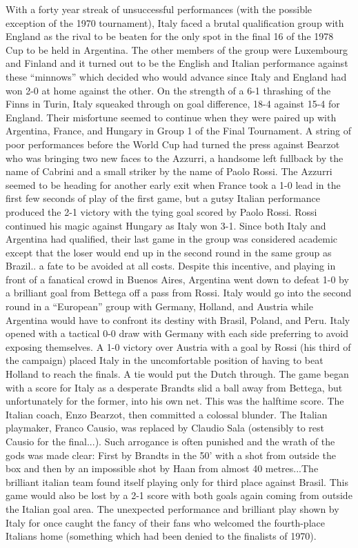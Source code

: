 With a forty year streak of unsuccessful performances (with the possible 
exception of the 1970 tournament), Italy faced a brutal qualification group with
England as the rival to be beaten for the only spot in the final 16 of the 1978
Cup to be held in Argentina. The other members of the group were Luxembourg and
Finland and it turned out to be the English and Italian performance against 
these ``minnows'' which decided who would advance since Italy and England had 
won 2-0 at home against the other. On the strength of a 6-1 thrashing of the 
Finns in Turin, Italy squeaked through on goal difference, 18-4 against 15-4 
for England. Their misfortune seemed to continue when they were paired up with 
Argentina, France, and Hungary in Group 1 of the Final Tournament. A string of 
poor performances before the World Cup had turned the press against Bearzot who
was bringing two new faces to the Azzurri, a handsome left fullback by the name
of Cabrini and a small striker by the name of Paolo Rossi. The Azzurri seemed 
to be heading for another early exit when France took a 1-0 lead in the first 
few seconds of play of the first game, but a gutsy Italian performance produced
the 2-1 victory with the tying goal scored by Paolo Rossi. Rossi continued his
magic against Hungary as Italy won 3-1. Since both Italy and Argentina had
qualified, their last game in the group was considered academic except that the
loser would end up in the second round in the same group as Brazil.. a fate to 
be avoided at all costs. Despite this incentive, and playing in front of a 
fanatical crowd in Buenos Aires, Argentina went down to defeat 1-0 by a 
brilliant goal from Bettega off a pass from Rossi. Italy would go into the 
second round in a ``European'' group with Germany, Holland, and Austria while 
Argentina would have to confront its destiny with Brasil, Poland, and Peru. 
Italy opened with a tactical 0-0 draw with Germany with each side preferring
to avoid exposing themselves. A 1-0 victory over Austria with a goal by Rossi
(his third of the campaign) placed Italy in the uncomfortable position of
having to beat Holland to reach the finals. A tie would put the Dutch through.
The game began with a score for Italy as a desperate Brandts slid a ball away 
from Bettega, but unfortunately for the former, into his own net. This was the 
halftime score. The Italian coach, Enzo Bearzot, then committed a colossal 
blunder. The Italian playmaker, Franco Causio, was replaced by Claudio Sala 
(ostensibly to rest Causio for the final...). Such arrogance is often punished 
and the wrath of the gods was made clear: First by  Brandts in the 50' with a 
shot from outside the box and then by an impossible shot by Haan from almost 
40 metres...The brilliant italian team found itself playing only for third 
place against Brasil. This game would also be lost by a 2-1 score with both 
goals again coming from outside the Italian goal area. The unexpected 
performance and brilliant play shown by Italy for once caught the fancy of 
their fans who welcomed the fourth-place Italians home (something which had 
been denied to the finalists of 1970).

